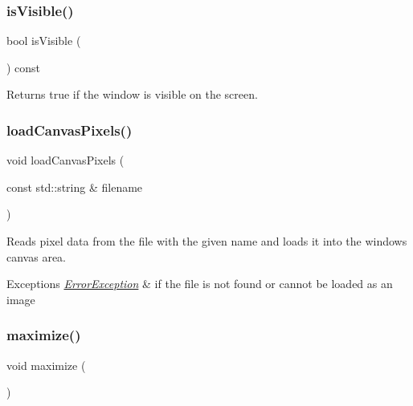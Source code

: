 \subsubsection{\texorpdfstring{is\+Visible()}{isVisible()}}
{\footnotesize\ttfamily bool is\+Visible (\begin{DoxyParamCaption}{ }\end{DoxyParamCaption}) const\hspace{0.3cm}{\ttfamily [virtual]}}



Returns true if the window is visible on the screen. 

\mbox{\label{classGWindow_ae2462f15e288c06c5136e31a8ac8151c}} 
\subsubsection{\texorpdfstring{load\+Canvas\+Pixels()}{loadCanvasPixels()}}
{\footnotesize\ttfamily void load\+Canvas\+Pixels (\begin{DoxyParamCaption}\item[{const std\+::string \&}]{filename }\end{DoxyParamCaption})\hspace{0.3cm}{\ttfamily [virtual]}}



Reads pixel data from the file with the given name and loads it into the window\textquotesingle{}s canvas area. 


\begin{DoxyExceptions}{Exceptions}
{\em \mbox{\hyperlink{classErrorException}{Error\+Exception}}} & if the file is not found or cannot be loaded as an image \\
\hline
\end{DoxyExceptions}
\mbox{\label{classGWindow_a1aa481996525792213f28d91fbb4894b}} 
\subsubsection{\texorpdfstring{maximize()}{maximize()}}
{\footnotesize\ttfamily void maximize (\begin{DoxyParamCaption}{ }\end{DoxyParamCaption})\hspace{0.3cm}{\ttfamily [virtual]}}



